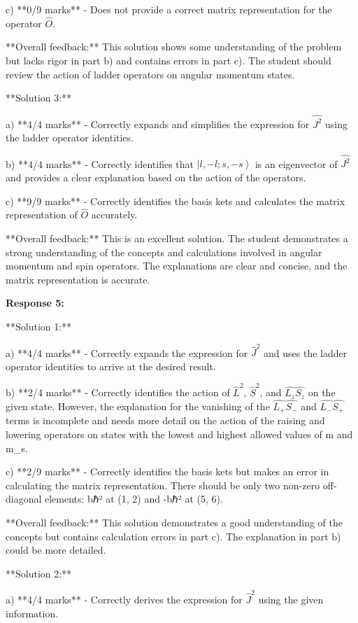 \documentclass[a4paper,11pt]{article}
\begin{document}
c) **0/9 marks** - Does not provide a correct matrix representation for the operator \( \hat{O} \).

**Overall feedback:** This solution shows some understanding of the problem but lacks rigor in part b) and contains errors in part c). The student should review the action of ladder operators on angular momentum states.

**Solution 3:**

a) **4/4 marks** - Correctly expands and simplifies the expression for \( \hat{J^2} \) using the ladder operator identities.

b) **4/4 marks** - Correctly identifies that \( \left|l, -l; s, -s \right> \) is an eigenvector of \( \hat{J^2} \) and provides a clear explanation based on the action of the operators.

c) **9/9 marks** - Correctly identifies the basis kets and calculates the matrix representation of \( \hat{O} \) accurately.

**Overall feedback:** This is an excellent solution. The student demonstrates a strong understanding of the concepts and calculations involved in angular momentum and spin operators. The explanations are clear and concise, and the matrix representation is accurate.

\textbf{Response 5:}

**Solution 1:**

a) **4/4 marks** - Correctly expands the expression for  \(\hat{J}^2\) and uses the ladder operator identities to arrive at the desired result.

b) **2/4 marks** - Correctly identifies the action of \(\hat{L}^2\), \(\hat{S}^2\), and \(\hat{L_z}\hat{S_z}\) on the given state. However, the explanation for the vanishing of the \(\hat{L_+}\hat{S_-}\) and \(\hat{L_-}\hat{S_+}\) terms is incomplete and needs more detail on the action of the raising and lowering operators on states with the lowest and highest allowed values of m and m_s.

c) **2/9 marks** - Correctly identifies the basis kets but makes an error in calculating the matrix representation. There should be only two non-zero off-diagonal elements: bℏ² at (1, 2) and -bℏ² at (5, 6).

**Overall feedback:** This solution demonstrates a good understanding of the concepts but contains calculation errors in part c). The explanation in part b) could be more detailed.

**Solution 2:**

a) **4/4 marks** - Correctly derives the expression for \(\hat{J}^2\) using the given information.
\end{document}
